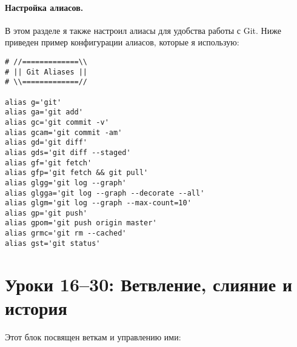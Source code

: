 \label{fig:git_immersion_staging}

\paragraph{Настройка алиасов.} В этом разделе я также настроил алиасы для удобства работы с Git.
Ниже приведен пример конфигурации алиасов, которые я использую:
\begin{verbatim}
# //=============\\
# || Git Aliases ||
# \\=============//

alias g='git'
alias ga='git add'
alias gc='git commit -v'
alias gcam='git commit -am'
alias gd='git diff'
alias gds='git diff --staged'
alias gf='git fetch'
alias gfp='git fetch && git pull'
alias glgg='git log --graph'
alias glgga='git log --graph --decorate --all'
alias glgm='git log --graph --max-count=10'
alias gp='git push'
alias gpom='git push origin master'
alias grmc='git rm --cached'
alias gst='git status'

\end{verbatim}

\clearpage


\section{Уроки 16--30: Ветвление, слияние и история}\label{sec:git-immersion-branching-merging}
Этот блок посвящен веткам и управлению ими:

